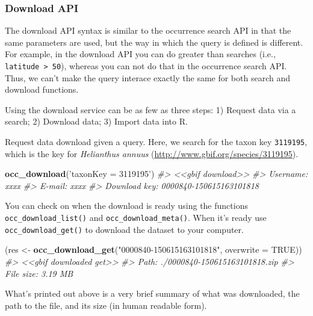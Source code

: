 \documentclass[author-year, review, 11pt]{components/elsarticle} %
\newenvironment{Shaded}{\begin{snugshade}}{\end{snugshade}}
\newcommand{\KeywordTok}[1]{\textcolor[rgb]{0.13,0.29,0.53}{\textbf{{#1}}}}
\newcommand{\DataTypeTok}[1]{\textcolor[rgb]{0.13,0.29,0.53}{{#1}}}
\newcommand{\StringTok}[1]{\textcolor[rgb]{0.31,0.60,0.02}{{#1}}}
\newcommand{\CommentTok}[1]{\textcolor[rgb]{0.56,0.35,0.01}{\textit{{#1}}}}
\newcommand{\OtherTok}[1]{\textcolor[rgb]{0.56,0.35,0.01}{{#1}}}
\newcommand{\NormalTok}[1]{{#1}}
\begin{document}
\subsubsection{Download API}\label{download-api}

The download API syntax is similar to the occurrence search API in that
the same parameters are used, but the way in which the query is defined
is different. For example, in the download API you can do greater than
searches (i.e., \texttt{latitude \textgreater{} 50}), whereas you can
not do that in the occurrence search API. Thus, we can't make the query
interace exactly the same for both search and download functions.

Using the download service can be as few as three steps: 1) Request data
via a search; 2) Download data; 3) Import data into R.

Request data download given a query. Here, we search for the taxon key
\texttt{3119195}, which is the key for \emph{Helianthus annuus}
(\url{http://www.gbif.org/species/3119195}).

\begin{Shaded}
\begin{Highlighting}[]
\KeywordTok{occ_download}\NormalTok{(}\StringTok{'taxonKey = 3119195'}\NormalTok{)}
\CommentTok{#> <<gbif download>>}
\CommentTok{#>   Username: xxxx}
\CommentTok{#>   E-mail: xxxx}
\CommentTok{#>   Download key: 0000840-150615163101818}
\end{Highlighting}
\end{Shaded}

You can check on when the download is ready using the functions
\texttt{occ\_download\_list()} and \texttt{occ\_download\_meta()}. When
it's ready use \texttt{occ\_download\_get()} to download the dataset to
your computer.

\begin{Shaded}
\begin{Highlighting}[]
\NormalTok{(res <-}\StringTok{ }\KeywordTok{occ_download_get}\NormalTok{(}\StringTok{"0000840-150615163101818"}\NormalTok{, }\DataTypeTok{overwrite =} \OtherTok{TRUE}\NormalTok{))}
\CommentTok{#> <<gbif downloaded get>>}
\CommentTok{#>   Path: ./0000840-150615163101818.zip}
\CommentTok{#>   File size: 3.19 MB}
\end{Highlighting}
\end{Shaded}

What's printed out above is a very brief summary of what was downloaded,
the path to the file, and its size (in human readable form).
\end{document}
